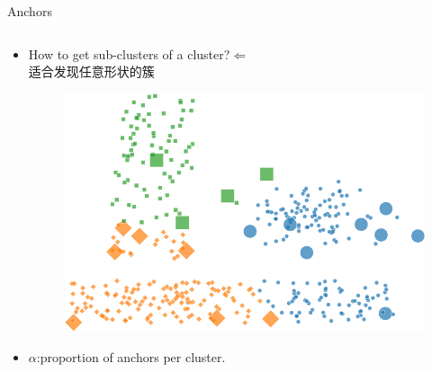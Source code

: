 \documentclass{beamer}
\begin{document}
\begin{frame}{Anchors}
    \begin{columns}

        \begin{column}{0.48\textwidth}
            \begin{itemize}
                \item How to get sub-clusters of a cluster?$\Leftarrow$ \\
                适合发现任意形状的簇
                \begin{figure}
                    \centering
                    \includegraphics[width=0.8\linewidth]{./images/anchors.png}
                \end{figure}
                \item $\alpha$:proportion of anchors per cluster.
            \end{itemize}


\end{column}
\end{columns}
\end{frame}
\end{document}
